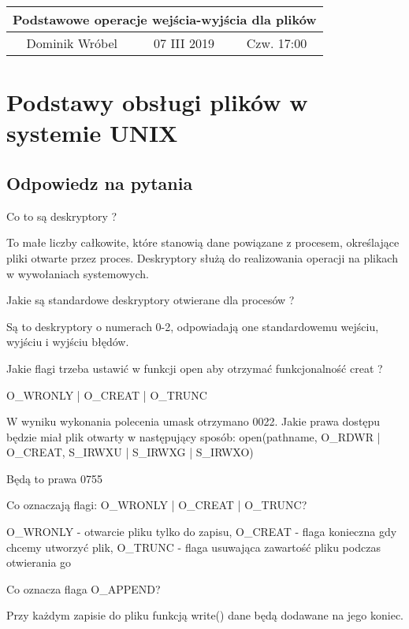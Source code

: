 \documentclass[a4paper,15pt]{article}
\newcommand{\ask}[2]{
    \begin{tcolorbox}[colback=black!5!white,colframe=gray,title={Pytanie #1}]
        #2
    \end{tcolorbox}
}
\begin{document}
\begin{table}
\begin{center}
\begin{tabular}{|c|c|c|}
\hline
\multicolumn{3}{|c|}{\textbf{Podstawowe operacje wejścia-wyjścia dla plików}} \\ \hline Dominik Wróbel & 07 III 2019 & Czw. 17:00 \\ \hline

\end{tabular}
\end{center}
\end{table}

\tableofcontents

\newpage
\section{Podstawy obsługi plików w systemie UNIX}
\subsection{Odpowiedz na pytania}

\ask{}{Co to są deskryptory ?}

To małe liczby całkowite, które stanowią dane powiązane z procesem, określające pliki otwarte przez proces. Deskryptory służą do realizowania operacji na plikach w wywołaniach systemowych. 

\ask{}{
Jakie są standardowe deskryptory otwierane dla procesów ? 
}

Są to deskryptory o numerach 0-2, odpowiadają one standardowemu wejściu, wyjściu i wyjściu błędów. 

\ask{}{
Jakie flagi trzeba ustawić w funkcji open aby otrzymać funkcjonalność creat ? 
}

O\_WRONLY | O\_CREAT | O\_TRUNC

\ask{}{
W wyniku wykonania polecenia umask otrzymano 0022. Jakie prawa dostępu będzie miał plik otwarty w następujący sposób:
open(pathname, O\_RDWR | O\_CREAT, S\_IRWXU | S\_IRWXG | S\_IRWXO) 
}

Będą to prawa 0755 

\ask{}{
Co oznaczają flagi: O\_WRONLY | O\_CREAT | O\_TRUNC? 
}

O\_WRONLY - otwarcie pliku tylko do zapisu, O\_CREAT - flaga konieczna gdy chcemy utworzyć plik, O\_TRUNC - flaga usuwająca zawartość pliku podczas otwierania go

\ask{}{
Co oznacza flaga O\_APPEND?
} 

Przy każdym zapisie do pliku funkcją write() dane będą dodawane na jego koniec.
\end{document}
